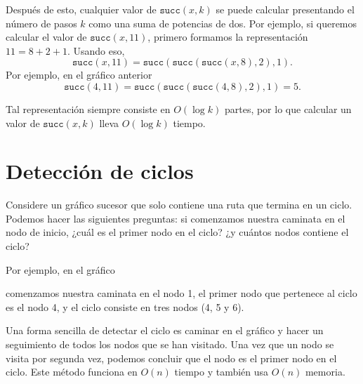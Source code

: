 Después de esto, cualquier valor de $\texttt{succ}(x,k)$ se puede calcular
presentando el número de pasos $k$ como una suma de potencias de dos.
Por ejemplo, si queremos calcular el valor de $\texttt{succ}(x,11)$,
primero formamos la representación $11=8+2+1$.
Usando eso,
\[\texttt{succ}(x,11)=\texttt{succ}(\texttt{succ}(\texttt{succ}(x,8),2),1).\]
Por ejemplo, en el gráfico anterior
\[\texttt{succ}(4,11)=\texttt{succ}(\texttt{succ}(\texttt{succ}(4,8),2),1)=5.\]

Tal representación siempre consiste en
$O(\log k)$ partes, por lo que calcular un valor de $\texttt{succ}(x,k)$
lleva $O(\log k)$ tiempo.

\section{Detección de ciclos}


Considere un gráfico sucesor que solo contiene
una ruta que termina en un ciclo.
Podemos hacer las siguientes preguntas:
si comenzamos nuestra caminata en el nodo de inicio,
¿cuál es el primer nodo en el ciclo?
¿y cuántos nodos contiene el ciclo?

Por ejemplo, en el gráfico

\begin{center}
\end{center}
comenzamos nuestra caminata en el nodo 1,
el primer nodo que pertenece al ciclo es el nodo 4, y el ciclo consiste
en tres nodos (4, 5 y 6).

Una forma sencilla de detectar el ciclo es caminar en el
gráfico y hacer un seguimiento de
todos los nodos que se han visitado. Una vez que un nodo se visita
por segunda vez, podemos concluir
que el nodo es el primer nodo en el ciclo.
Este método funciona en $O(n)$ tiempo y también usa
$O(n)$ memoria.

